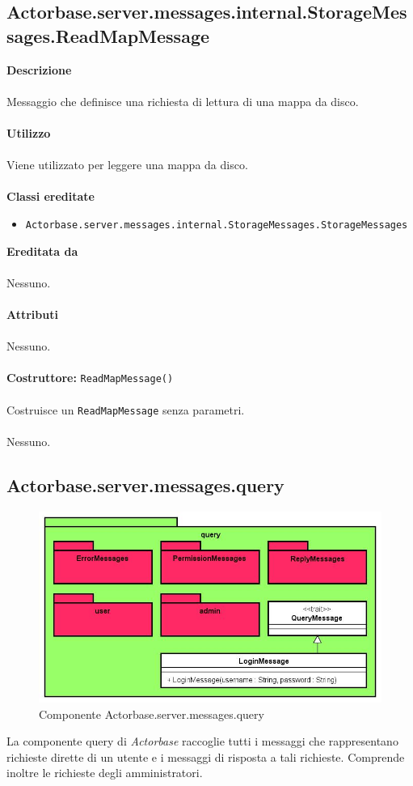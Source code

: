\documentclass[a4paper]{article}
\begin{document}
	\subsection{Actorbase.server.messages.internal.StorageMessages.ReadMapMessage}
		\textbf{Descrizione}
			\\ \\
			Messaggio che definisce una richiesta di lettura di una mappa da disco.
			\\ \\
		\textbf{Utilizzo}
			\\ \\
			Viene utilizzato per leggere una mappa da disco.
			\\ \\
		\textbf{Classi ereditate}
			\begin{itemize}
				\item \texttt{Actorbase.server.messages.internal.StorageMessages.StorageMessages}
			\end{itemize}
		\textbf{Ereditata da}
			\\ \\
			Nessuno.
			\\ \\
		\textbf{Attributi}
			\\ \\
			Nessuno.
			\\ \\
		\textbf{Costruttore:} \texttt{ReadMapMessage()}
		\\ \\
		Costruisce un \texttt{ReadMapMessage} senza parametri.
		\\ \\
		Nessuno.
			
	\subsection{Actorbase.server.messages.query}
		\begin{figure}[H]
			\centering
			\includegraphics[scale=0.5]{Server/queryLevel.jpg}
			\caption{Componente Actorbase.server.messages.query}
		\end{figure}
		La componente query di \emph{Actorbase} raccoglie tutti i messaggi che rappresentano richieste dirette di un utente e i messaggi di risposta a tali richieste. Comprende inoltre le richieste degli amministratori.
		
\end{document}
